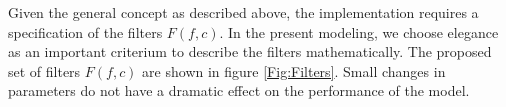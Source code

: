 Given the general concept as described above, the implementation
requires a specification of the filters $F(f,c)$. In the present
modeling, we choose elegance as an important criterium to
describe the filters mathematically.
%
%
%
The proposed set of filters $F(f,c)$ are shown in figure
\ref{Fig:Filters}. Small changes in parameters do not have a
dramatic effect on the performance of the model.

